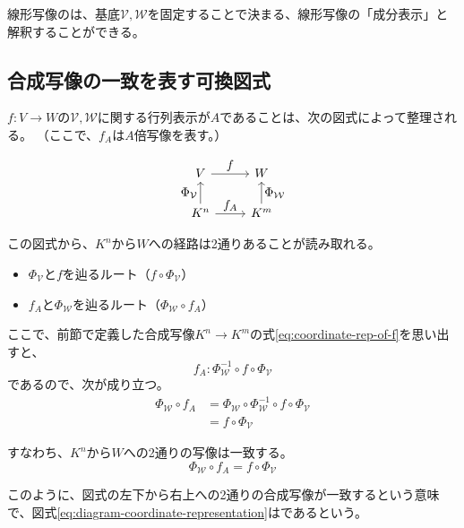 \documentclass[../../../topic_linear-algebra]{subfiles}
\begin{document}
線形写像のは、基底$\mathcal{V},\mathcal{W}$を固定することで決まる、線形写像の「成分表示」と解釈することができる。

\subsection{合成写像の一致を表す可換図式}

$f\colon V \to W$の$\mathcal{V},\mathcal{W}$に関する行列表示が$A$であることは、次の図式によって整理される。
（ここで、$f_A$は$A$倍写像を表す。）

\begin{equation}\label{eq:diagram-coordinate-representation}
  \begin{tikzcd}[every label/.append style = {font = \normalsize}]
    V \arrow[r,"f"] & W \\
    K^n \arrow[u,"{\Phi_{\mathcal{V}}}"] \arrow[r,"f_A"] & K^m \arrow[u,"{\Phi_{\mathcal{W}}}"']
  \end{tikzcd}
\end{equation}

\br

この図式から、$K^n$から$W$への経路は2通りあることが読み取れる。
\begin{itemize}
  \item $\Phi_{\mathcal{V}}$と$f$を辿るルート（$f \circ \Phi_{\mathcal{V}}$）
  \item $f_A$と$\Phi_{\mathcal{W}}$を辿るルート（$\Phi_{\mathcal{W}} \circ f_A$）
\end{itemize}

ここで、前節で定義した合成写像$K^n \to K^m$の式\eqref{eq:coordinate-rep-of-f}を思い出すと、
\begin{equation*}
  f_A\colon \Phi_\mathcal{W}^{-1} \circ f \circ \Phi_\mathcal{V}
\end{equation*}
であるので、次が成り立つ。
\begin{align*}
  \Phi_{\mathcal{W}} \circ f_A &= \Phi_{\mathcal{W}} \circ \Phi_\mathcal{W}^{-1} \circ f \circ \Phi_\mathcal{V} \\
  &= f \circ \Phi_\mathcal{V}
\end{align*}

すなわち、$K^n$から$W$への2通りの写像は一致する。
\begin{equation*}
  \Phi_{\mathcal{W}} \circ f_A = f \circ \Phi_\mathcal{V}
\end{equation*}

このように、図式の左下から右上への2通りの合成写像が一致するという意味で、図式\eqref{eq:diagram-coordinate-representation}はであるという。
\end{document}

